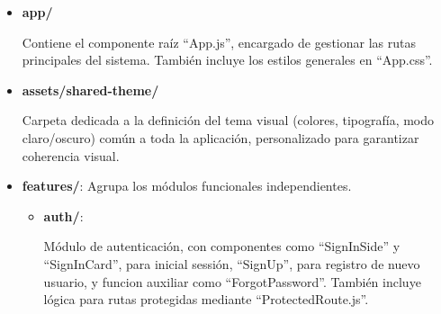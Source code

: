 \begin{itemize}
    \item \textbf{app/}
    
    Contiene el componente raíz ``App.js'', encargado de gestionar las rutas principales del sistema. También incluye los estilos generales en ``App.css''.

    \item \textbf{assets/shared-theme/}
    
    Carpeta dedicada a la definición del tema visual (colores, tipografía, modo claro/oscuro) común a toda la aplicación, personalizado para garantizar coherencia visual.

    \item \textbf{features/}:
    Agrupa los módulos funcionales independientes. 
    \begin{itemize}
        \item \textbf{auth/}: 
        
        Módulo de autenticación, con componentes como ``SignInSide'' y ``SignInCard'', para inicial sessión, ``SignUp'', para registro de nuevo usuario, y funcion auxiliar como ``ForgotPassword''. 
        También incluye lógica para rutas protegidas mediante ``ProtectedRoute.js''.


\end{itemize}
\end{itemize}
